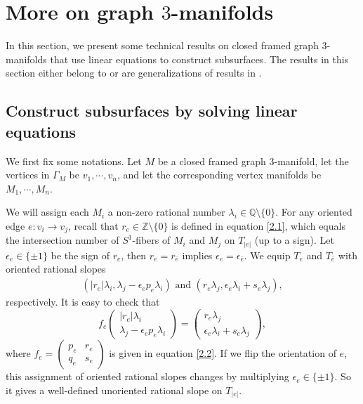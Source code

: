 \documentclass{amsart}
\numberwithin{equation}{section}
\theoremstyle{definition}
\begin{document}




\section{More on graph $3$-manifolds}\label{moregraph}

In this section, we present some technical results on closed framed graph $3$-manifolds that use linear equations to construct subsurfaces. The results in this section either belong to \cite{WY} or are generalizations of results in \cite{WY}. 

\subsection{Construct subsurfaces by solving linear equations}\label{equations}

We first fix some notations. Let $M$ be a closed framed graph $3$-manifold, let the vertices in $\Gamma_M$ be $v_1,\cdots, v_n$, and  let the corresponding vertex manifolds be $M_1,\cdots,M_n$. 

We will assign each $M_i$ a non-zero rational number $\lambda_i\in \mathbb{Q}\setminus \{0\}$. For any oriented edge $e:v_i\to v_j$, recall that $r_e\in \mathbb{Z}\setminus \{0\}$ is defined in equation \eqref{2.1}, which equals the intersection number of $S^1$-fibers of $M_i$ and $M_j$ on $T_{|e|}$ (up to a sign). Let $\epsilon_e\in \{\pm1\}$ be the sign of $r_e$, then $r_e=r_{\bar{e}}$ implies $\epsilon_e=\epsilon_{\bar{e}}$. We equip $T_e$ and $T_{\bar{e}}$ with oriented rational slopes
\begin{align}\label{5.1}
(|r_e|\lambda_i, \lambda_j-\epsilon_ep_e \lambda_i)\text{\ and\ }(r_e\lambda_j,\epsilon_e\lambda_i+s_e\lambda_j),
\end{align}
respectively. It is easy to check that
$$
f_e
\begin{pmatrix}
|r_e|\lambda_i\\ 
\lambda_j-\epsilon_ep_e \lambda_i
\end{pmatrix}=
\begin{pmatrix}
r_e\lambda_j\\
\epsilon_e\lambda_i+s_e\lambda_j
\end{pmatrix},
$$
where $f_e=\begin{pmatrix}
p_e & r_e\\ 
q_e & s_e
\end{pmatrix}$ is given in equation \eqref{2.2}. If we flip the orientation of $e$, this assignment of oriented rational slopes changes by multiplying $\epsilon_e\in \{\pm 1\}$. So it gives a well-defined unoriented rational slope on $T_{|e|}$.
\end{document}
